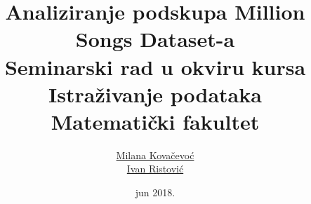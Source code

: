 \documentclass[a4paper]{article}
\begin{document}
\title{Analiziranje podskupa Million Songs Dataset-a\\ \small{Seminarski rad u okviru kursa\\Istra\v{z}ivanje podataka\\ Matematički fakultet}}

\author{\href{mailto:mi14031@matf.bg.ac.rs}{Milana Kova\v{c}evo\'c}\\\href{mailto:mi14042@matf.bg.ac.rs}{Ivan Ristovi\'c}}
\date{jun 2018.}

\maketitle



\tableofcontents

\newpage










\newpage

\begin{appendices}

\end{appendices}
\end{document}
